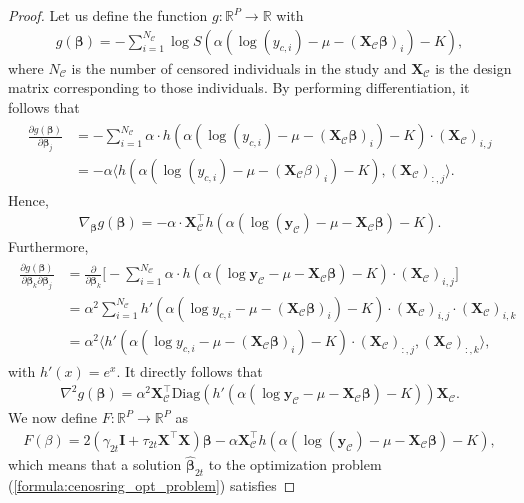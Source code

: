\begin{proof}
    Let us define the function $g: \mathbb{R}^P \to \mathbb{R}$ with
    \begin{align}
    g(\bm{\beta}) = - \sum_{i=1}^{N_{\mathcal C}} \log S(\alpha(\log(y_{c,i}) - \mu - (\bm{X}_\mathcal{C} \bm{\beta})_i) -K),
    \end{align}
    where $N_{\mathcal C}$ is the number of censored individuals in the study and $\bm{X}_{\mathcal C}$ is the design matrix corresponding to those individuals. By performing differentiation, it follows that
    \begin{align}
        \begin{split}
        \frac{\partial g(\bm{\beta})}{\partial \bm{\beta}_j} & = - \sum_{i=1}^{N_{\mathcal C}} \alpha \cdot h(\alpha(\log(y_{c,i}) - \mu - (\bm{X}_\mathcal{C} \bm{\beta})_i) - K) \cdot  (\bm{X}_{\mathcal C})_{i,j} \\ & = - \alpha \langle h(\alpha(\log(y_{c,i}) - \mu - (\bm{X}_\mathcal{C} \beta)_i) - K), (\bm{X}_{\mathcal C})_{:,j} \rangle.
        \end{split}
    \end{align}
    Hence,
    \begin{align}
        \nabla_{\bm{\beta}} g(\bm{\beta})  = - \alpha \cdot \bm{X}_{\mathcal C}^\top h(\alpha(\log(\bm{y}_\mathcal{C}) - \mu - \bm{X}_\mathcal{C} \bm{\beta}) - K).
    \end{align}
    Furthermore,
    \begin{align}
        \begin{split}
        \frac{\partial g(\bm{\beta})}{\partial \bm{\beta}_k \partial \bm{\beta}_j} & = \frac{\partial}{\partial \bm{\beta}_k} \bigg [ - \sum_{i=1}^{N_{\mathcal C}} \alpha \cdot h(\alpha(\log \bm{y}_\mathcal{C} - \mu - \bm{X}_\mathcal{C} \bm{\beta})-K) \cdot (\bm{X}_{\mathcal C})_{i,j} \bigg ] \\
        & = \alpha^2 \sum_{i=1}^{N_{\mathcal C}} h'(\alpha (\log y_{c,i} - \mu - (\bm{X}_\mathcal{C} \bm{\beta})_i) - K) \cdot (\bm{X}_{\mathcal C})_{i,j} \cdot (\bm{X}_{\mathcal C})_{i,k} \\
        & = \alpha^2 \langle h'(\alpha (\log y_{c,i} - \mu - (\bm{X}_\mathcal{C} \bm{\beta})_i) - K) \cdot (\bm{X}_{\mathcal C})_{:,j}, (\bm{X}_{\mathcal C})_{:,k} \rangle,
        \end{split}
    \end{align}
    with $h'(x) = e^x$.
    It directly follows that
    \begin{align}
        \nabla^2 g(\bm{\beta}) = \alpha^2 \bm{X}_\mathcal{C}^\top \text{Diag}(h'(\alpha(\log \bm{y}_\mathcal{C} - \mu - \bm{X}_\mathcal{C} \bm{\beta})-K)) \bm{X}_\mathcal{C}.
    \end{align}
    We now define $F:\mathbb{R}^P \to \mathbb{R}^P$ as
    \begin{align}
        F(\beta) = 2(\gamma_{2t}\bm{I} + \tau_{2t}\bm{X}^\top\bm{X}) \bm{\beta} - \alpha \bm{X}_\mathcal{C}^\top h(\alpha(\log(\bm{y_\mathcal{C}}) - \mu - \bm{X_\mathcal{C}} \bm{\beta})-K),
    \end{align}
    which means that a solution $\hat{\bm{\beta}}_{2t}$ to the optimization problem (\ref{formula:cenosring_opt_problem}) satisfies 
    

\end{proof}
